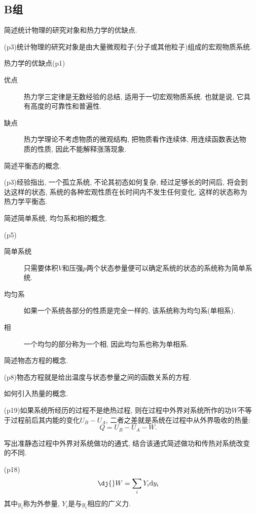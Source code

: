 \subsection{B组}
\begin{questions}
  \question 简述统计物理的研究对象和热力学的优缺点.
  \begin{solution}
    (p3)统计物理的研究对象是由大量微观粒子(分子或其他粒子)组成的宏观物质系统.

    热力学的优缺点(p1)
    \begin{description}
      \item[优点] 热力学三定律是无数经验的总结, 适用于一切宏观物质系统. 也就是说, 它具有高度的可靠性和普遍性.
      \item[缺点] 热力学理论不考虑物质的微观结构, 把物质看作连续体, 用连续函数表达物质的性质, 因此不能解释涨落现象.
    \end{description}
  \end{solution}
  \question 简述平衡态的概念.
  \begin{solution}
    (p3)经验指出, 一个孤立系统, 不论其初态如何复杂, 经过足够长的时间后, 将会到达这样的状态, 系统的各种宏观性质在长时间内不发生任何变化, 这样的状态称为热力学平衡态.
  \end{solution}
  \question 简述简单系统, 均匀系和相的概念.
  \begin{solution}
    (p5)
    \begin{description}
      \item[简单系统] 只需要体积$V$和压强$p$两个状态参量便可以确定系统的状态的系统称为简单系统.
      \item[均匀系] 如果一个系统各部分的性质是完全一样的, 该系统称为均匀系(单相系).
      \item[相] 一个均匀的部分称为一个相, 因此均匀系也称为单相系.
    \end{description}
  \end{solution}
  \question 简述物态方程的概念.
  \begin{solution}
    (p8)物态方程就是给出温度与状态参量之间的函数关系的方程.
  \end{solution}
  \question 如何引入热量的概念.
  \begin{solution}
    (p19)如果系统所经历的过程不是绝热过程, 则在过程中外界对系统所作的功$W$不等于过程前后其内能的变化$U_B-U_A$, 二者之差就是系统在过程中从外界吸收的热量:
    \begin{equation}
      Q = U_B - U_A - W.
    \end{equation}
  \end{solution}
  \question 写出准静态过程中外界对系统做功的通式, 结合该通式简述做功和传热对系统改变的不同.
  \begin{solution}
    (p18)
    \begin{equation}
      \dj{} W = \sum_i Y_i \dd y_i
    \end{equation}
    其中$y_i$称为外参量, $Y_i$是与$y_i$相应的广义力.
  \end{solution}
\end{questions}
